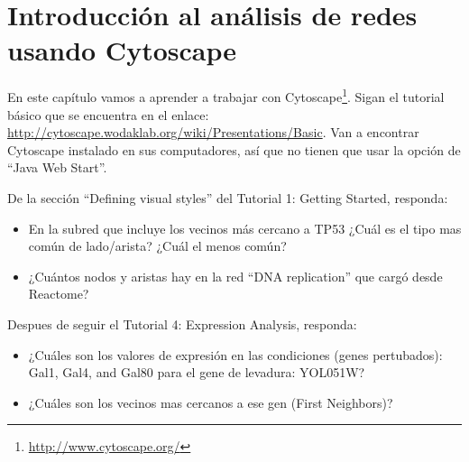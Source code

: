 \documentclass[letter,11pt]{book}
\begin{document}
\chapter{Introducción al análisis de redes usando Cytoscape}

En este capítulo vamos a aprender a trabajar con Cytoscape\footnote{\url{http://www.cytoscape.org/}}. Sigan el tutorial básico que se encuentra en el enlace: \url{http://cytoscape.wodaklab.org/wiki/Presentations/Basic}. Van a encontrar Cytoscape instalado en sus computadores, así que no tienen que usar la opción de ``Java Web Start''.

De la sección ``Defining visual styles'' del Tutorial 1: Getting Started, responda:

{\color{red}
\begin{itemize}
\item En la subred que incluye los vecinos más cercano a TP53 ¿Cuál es el tipo mas común de lado/arista? ¿Cuál el menos común?
\item ¿Cuántos nodos y aristas hay en la red ``DNA replication'' que cargó desde Reactome?
\end{itemize}
}

Despues de seguir el Tutorial 4: Expression Analysis, responda:

{\color{red}
\begin{itemize}
\item ¿Cuáles son los valores de expresión en las condiciones (genes pertubados): Gal1, Gal4, and Gal80 para el gene de levadura: YOL051W?
\item ¿Cuáles son los vecinos mas cercanos a ese gen (First Neighbors)?
\end{itemize}
}

% 
% 
% 
\end{document}
